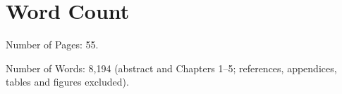 \chapter*{Word Count}

\noindent Number of Pages: 55.

\noindent Number of Words: 8,194 (abstract and Chapters 1--5; references, appendices, tables and figures excluded).

